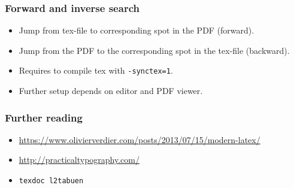 \documentclass[aspectratio=1610,hyperref={colorlinks,linkcolor=}]{beamer}
\begin{document}
\begin{frame}
    \frametitle{Forward and inverse search}
    \begin{itemize}
        \item Jump from tex-file to corresponding spot in the PDF (forward).
        \item Jump from the PDF to the corresponding spot in the tex-file (backward).
        \item Requires to compile tex with \texttt{-synctex=1}.
        \item Further setup depends on editor and PDF viewer.
    \end{itemize}
\end{frame}

\begin{frame}
    \frametitle{Further reading}
    \begin{itemize}
        \item \url{https://www.olivierverdier.com/posts/2013/07/15/modern-latex/}
        \item \url{http://practicaltypography.com/}
        \item \texttt{texdoc l2tabuen}
    \end{itemize}
\end{frame}

\end{document}
